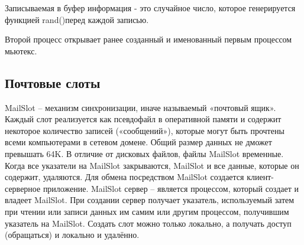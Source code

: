 \documentclass[a4paper]{article}
\begin{document}
	Записываемая в буфер информация - это случайное число, которое генерируется функцией rand()перед каждой записью.
	
	Второй процесс открывает ранее созданный и именованный первым процессом мьютекс.
	
\subsection{Почтовые слоты}
	MailSlot – механизм синхронизации, иначе называемый «почтовый ящик». Каждый слот реализуется как псевдофайл в оперативной памяти и содержит некоторое количество записей («сообщений»), которые могут быть прочтены всеми компьютерами в сетевом домене. Общий размер данных не дможет превышать 64K. В отличие от дисковых файлов, файлы MailSlot временные. Когда все указатели на MailSlot закрываются, MailSlot и все данные, которые он содержит, удаляются. Для обмена посредством MailSlot создается клиент-серверное приложение. MailSlot сервер – является процессом, который создает и владеет MailSlot. При создании сервер получает указатель, используемый затем при чтении или записи данных им самим или другим процессом, получившим указатель на MailSlot. Создать слот можно только локально, а получать доступ (обращаться) и локально и удалённо.
	
\end{document}
